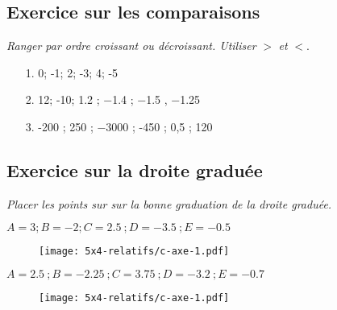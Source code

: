 \subsection*{Exercice sur les comparaisons}

\textit{Ranger par ordre croissant ou décroissant. Utiliser }$>$ \textit{ et } $<$.

\begin{enumerate}
  \item[1.] 0; -1; 2; -3; 4; -5
  \item[2.] 12; -10; \SI{1,2}{} ; \SI{-1,4}{} ; \SI{-1,5}{} , \SI{-1,25}{} 
  \item[3.] -200 ; 250 ; \SI{-3000}{} ; -450 ; 0,5 ; 120
\end{enumerate}

\subsection*{Exercice sur la droite graduée}

\textit{Placer les points sur sur la bonne graduation de la droite graduée.}

$A = 3 ; B = -2 ; C = \SI{2,5}{} ; D = \SI{-3,5}{} ; E = \SI{-0,5}{}$

\begin{figure}[H]
  \centering
  \texttt{[image: 5x4-relatifs/c-axe-1.pdf]}
\end{figure}

$A = \SI{2,5}{} ; B = \SI{-2,25}{} ; C = \SI{3,75}{} ; D = \SI{-3,2}{} ; E = \SI{-0,7}{}$

\begin{figure}[H]
  \centering
  \texttt{[image: 5x4-relatifs/c-axe-1.pdf]}
\end{figure}



